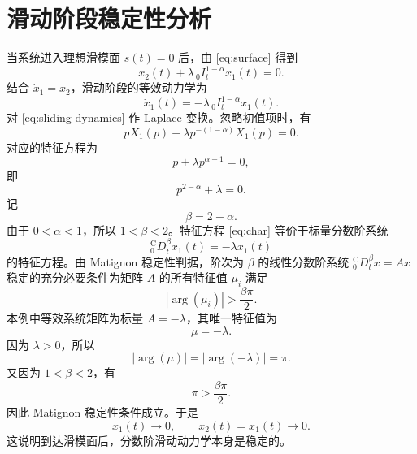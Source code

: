 \documentclass[UTF8,a4paper,11pt]{ctexart}
\begin{document}
\section{滑动阶段稳定性分析}

当系统进入理想滑模面 $s(t)=0$ 后，由 \eqref{eq:surface} 得到
\begin{equation}
  x_2(t)+\lambda\,{}_0 I_t^{1-\alpha}x_1(t)=0.
\end{equation}
结合 $\dot{x}_1=x_2$，滑动阶段的等效动力学为
\begin{equation}
  \dot{x}_1(t)
  =
  -\lambda\,{}_0 I_t^{1-\alpha}x_1(t).
  \label{eq:sliding-dynamics}
\end{equation}
对 \eqref{eq:sliding-dynamics} 作 Laplace 变换。忽略初值项时，有
\begin{equation}
  pX_1(p)+\lambda p^{-(1-\alpha)}X_1(p)=0.
\end{equation}
对应的特征方程为
\begin{equation}
  p+\lambda p^{\alpha-1}=0,
\end{equation}
即
\begin{equation}
  p^{2-\alpha}+\lambda=0.
  \label{eq:char}
\end{equation}
记
\begin{equation}
  \beta=2-\alpha.
\end{equation}
由于 $0<\alpha<1$，所以 $1<\beta<2$。特征方程 \eqref{eq:char} 等价于标量分数阶系统
\begin{equation}
  {}_0^{\mathrm{C}}D_t^\beta x_1(t)
  =
  -\lambda x_1(t)
\end{equation}
的特征方程。由 Matignon 稳定性判据，阶次为 $\beta$ 的线性分数阶系统
$ {}_0^{\mathrm{C}}D_t^\beta x=Ax $ 稳定的充分必要条件为矩阵 $A$ 的所有特征值
$\mu_i$ 满足
\begin{equation}
  |\arg(\mu_i)|>\frac{\beta\pi}{2}.
\end{equation}
本例中等效系统矩阵为标量 $A=-\lambda$，其唯一特征值为
\begin{equation}
  \mu=-\lambda.
\end{equation}
因为 $\lambda>0$，所以
\begin{equation}
  |\arg(\mu)|=|\arg(-\lambda)|=\pi.
\end{equation}
又因为 $1<\beta<2$，有
\begin{equation}
  \pi>\frac{\beta\pi}{2}.
\end{equation}
因此 Matignon 稳定性条件成立。于是
\begin{equation}
  x_1(t)\to 0,\qquad
  x_2(t)=\dot{x}_1(t)\to 0.
\end{equation}
这说明到达滑模面后，分数阶滑动动力学本身是稳定的。
\end{document}
